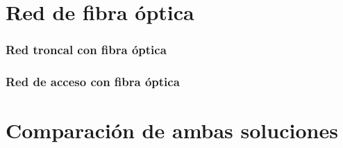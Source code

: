 \documentclass[11pt,a4paper]{article}
\begin{document}
\clearpage
\part{Red de fibra óptica}

\section{Red troncal con fibra óptica}

\section{Red de acceso con fibra óptica}


\part{Comparación de ambas soluciones}
\end{document}
